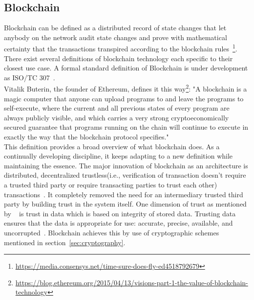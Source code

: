 \subsection{Blockchain}
Blockchain can be defined as a distributed record of state changes that let
anybody on the network audit state changes and prove with mathematical
certainty that the transactions transpired according to the blockchain
rules~\footnote{\url{https://media.consensys.net/time-sure-does-fly-ed4518792679}}.
There exist several definitions of blockchain technology each specific to their
closest use case. A formal standard definition of Blockchain is under
development as ISO/TC 307~\cite{ISOTC307}.\\
Vitalik Buterin, the founder of Ethereum, defines it this
way\footnote{\url{https://blog.ethereum.org/2015/04/13/visions-part-1-the-value-of-blockchain-technology}}:
"A blockchain is a magic computer that anyone can upload programs to and leave
the programs to self-execute, where the current and all previous states of
every program are always publicly visible, and which carries a very strong
cryptoeconomically secured guarantee that programs running on the chain will
continue to execute in exactly the way that the blockchain protocol
specifies."\\
This definition provides a broad overview of what blockchain does. As a
continually developing discipline, it keeps adapting to a new definition while
maintaining the essence. The major innovation of blockchain as an architecture
is distributed, decentralized trustless(i.e., verification of transaction
doesn't require a trusted third party or require transacting parties to trust
each other) transactions~\cite{Bitcoin_Satoshi}. It completely removed the need
for an intermediary trusted third party by building trust in the system itself.
One dimension of trust as mentioned by ~\cite{miller2010trust} is trust in data
which is based on integrity of stored data.  Trusting data ensures that the
data is appropriate for use: accurate, precise, available, and
uncorrupted~\cite{miller2010trust}.  Blockchain achieves this by use of
cryptographic schemes mentioned in section~\ref{sec:cryptography}.
\newpage

